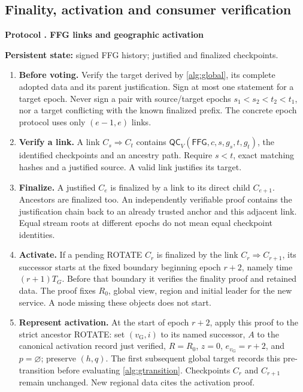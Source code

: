 \documentclass[11pt,a4paper,onecolumn]{article}
\newcommand{\QC}{\mathsf{QC}}
\newcommand{\gv}{v_{\mathrm G}}
\newcommand{\Tag}[1]{\mathsf{#1}}
\theoremstyle{remark}\newtheorem{example}[definition]{Example}
\newcounter{protocol}
\newenvironment{protocol}[2]{\refstepcounter{protocol}\label{#1}\begin{mdframed}[nobreak=true,linewidth=.6pt,skipabove=10pt,skipbelow=10pt,innertopmargin=8pt,innerbottommargin=8pt]\small\raggedright\noindent\textbf{Protocol \theprotocol. #2}\par\smallskip}{\end{mdframed}}
\begin{document}
\Needspace{.65\textheight}\subsection{Finality, activation and consumer verification}\label{sec:finality}
\begin{protocol}{alg:finality}{FFG links and geographic activation}
\textbf{Persistent state:} signed FFG history; justified and finalized checkpoints.
\begin{enumerate}[label=\textbf{F\arabic*.}]
\item \textbf{Before voting.} Verify the target derived by \cref{alg:global},
its complete adopted data and its parent justification. Sign at most one
statement for a target epoch. Never sign a pair with source/target epochs
$s_1<s_2<t_2<t_1$, nor a target conflicting with the known finalized prefix.
The concrete epoch protocol uses only $(e-1,e)$ links.
\item \textbf{Verify a link.} A link $C_s\Rightarrow C_t$ contains
$\QC_V(\Tag{FFG},c,s,g_s,t,g_t)$, the identified checkpoints and an ancestry
path. Require $s<t$, exact matching hashes and a justified source.
A valid link justifies its target.
\item \textbf{Finalize.} A justified $C_e$ is finalized by a link to its direct
child $C_{e+1}$. Ancestors are finalized too. An independently verifiable proof
contains the justification chain back to an already trusted anchor and this
adjacent link. Equal stream roots at different epochs do not mean equal
checkpoint identities.
\item \textbf{Activate.} If a pending ROTATE $C_r$ is finalized by the link
$C_r\Rightarrow C_{r+1}$, its successor starts at the fixed boundary beginning
epoch $r+2$, namely time $(r+1)T_G$. Before that boundary it verifies the finality
proof and retained data. The proof fixes $R_0$, global view, region and initial
leader for the new service. A node missing these objects does not start.
\item \textbf{Represent activation.} At the start of epoch $r+2$, apply this
proof to the strict ancestor ROTATE: set $(\gv,i)$ to its named successor,
$A$ to the canonical activation record just verified, $R=R_0$, $z=0$, $e_{\gv}=r+2$, and $p=\varnothing$;
preserve $(h,q)$. The first subsequent global target records this pre-transition
before evaluating \cref{alg:gtransition}. Checkpoints $C_r$ and
$C_{r+1}$ remain unchanged. New regional data cites the activation proof.
\end{enumerate}
\end{protocol}
\end{document}
